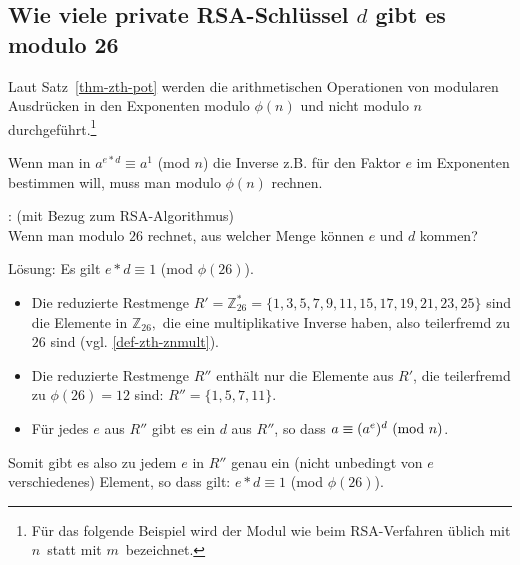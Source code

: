 \begin{refsegment}
\subsection{Wie viele private RSA-Schlüssel \texorpdfstring{$d$}{d} gibt es modulo 26}
\label{L_nt_Num-of-d-mod-26}

Laut Satz~\ref{thm-zth-pot} werden die arithmetischen Operationen von modularen
Ausdrücken in den Exponenten modulo $\phi(n)$ und nicht modulo $n$
durchgeführt.\footnote{%
Für das folgende Beispiel wird der Modul wie beim RSA-Verfahren üblich mit
\glqq $n$\grqq~statt mit \glqq $m$\grqq~bezeichnet.}

Wenn man in $a^{e*d} \equiv a^1$ (mod $n$) die Inverse z.B. für den Faktor $e$
im Exponenten bestimmen will, muss man modulo $\phi(n)$ rechnen.

\begin{example}{:} (mit Bezug zum RSA-Algorithmus)\\
Wenn man modulo $26$ rechnet, aus welcher Menge können $e$ und $d$ kommen?

Lösung: Es gilt $e*d \equiv 1$ (mod $\phi(26)$).
\begin{itemize}
   \item[] Die reduzierte Restmenge
$R' = \mathbb{Z}_{26}^* = \{ 1, 3, 5, 7, 9, 11, 15, 17, 19, 21, 23, 25 \}$ sind die
Elemente in $\mathbb{Z}_{26}, $ die eine multiplikative Inverse haben,
also teilerfremd
zu $26$ sind (vgl. \ref{def-zth-znmult}).
   \item[] Die reduzierte Restmenge $R''$ enthält nur die Elemente aus
           $R'$, die teilerfremd zu $\phi(26) = 12$ sind:
           $R'' = \{ 1, 5, 7, 11 \}$.
   \item[] Für jedes $e$ aus $R''$ gibt es ein $d$ aus $R''$, so dass
           $a \equiv (a^e)^d{\rm ~(mod~}n)$.
\end{itemize}
Somit gibt es also zu jedem $e$ in $R''$ genau ein (nicht unbedingt von
$e$ verschiedenes) Element, so dass gilt: $e*d \equiv 1$ (mod $\phi(26)$).


\end{example}
\end{refsegment}
